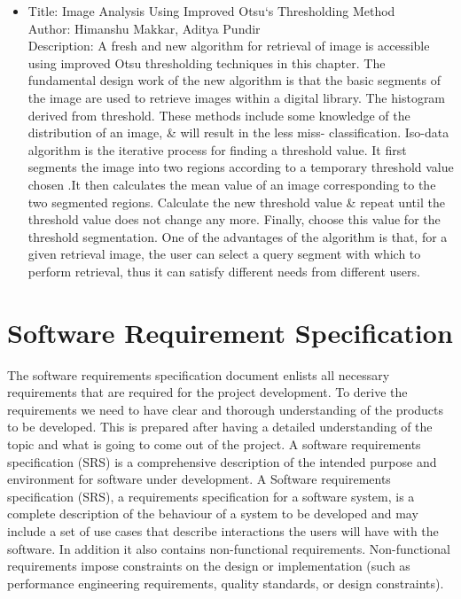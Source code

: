 \documentclass[oneside,a4paper,12pt]{report}
\begin{document}
\begin{itemize}
\item Title: Image Analysis Using Improved Otsu‘s Thresholding Method\\
Author: Himanshu Makkar, Aditya Pundir\\
Description: A fresh and new algorithm for retrieval of image is accessible using improved Otsu thresholding techniques in this chapter. The fundamental design work of the new algorithm is that the basic segments of the image are used to retrieve images within a digital library. The histogram derived from threshold. These methods include some knowledge of the distribution of an image, \& will result in the less miss-
classification. Iso-data algorithm is the iterative process for finding a threshold value. It first segments the image into two regions according to a temporary threshold value chosen .It then calculates the mean value of an image corresponding to the two segmented regions. Calculate the new
threshold value \& repeat until the threshold value does not change any more. Finally, choose this value for the threshold segmentation. One of the advantages of the algorithm is that, for a given retrieval image, the user can select a query segment with which to perform retrieval, thus it can satisfy different needs from different users.\\
 
\end{itemize}

\chapter{Software Requirement Specification}
The software requirements specification document enlists all necessary requirements that are required for the project development. To derive the requirements we need to have clear and thorough understanding of the products to be developed. This is prepared after having a detailed understanding of the topic and what is going to come out of the project. A software requirements specification (SRS) is a comprehensive description of the intended purpose and environment for software under development.
A Software requirements specification (SRS), a requirements specification for a software system, is a complete description of the behaviour of a system to be developed and may include a set of use cases that describe interactions the users will have with the software. In addition it also contains non-functional requirements. Non-functional requirements impose constraints on the design or implementation (such as performance engineering requirements, quality standards, or design constraints).
\end{document}
